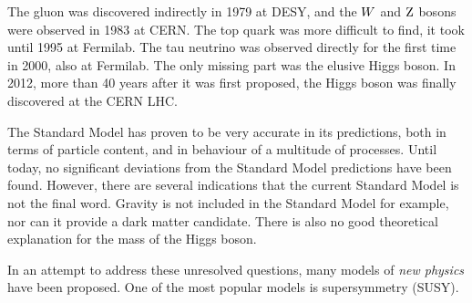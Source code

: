 The gluon was discovered indirectly in 1979 at DESY, and the $W$ and $\mathrm{Z}$ bosons were observed
in 1983 at CERN. The top quark was more difficult to find, it took until 1995 at Fermilab. The tau
neutrino was observed directly for the first time in 2000, also at Fermilab. The only missing part
was the elusive Higgs boson. In 2012, more than 40 years after it was first proposed, the Higgs
boson was finally discovered at the CERN LHC.

The Standard Model has proven to be very accurate in its predictions, both in terms of particle
content, and in behaviour of a multitude of processes. Until today, no significant deviations from
the Standard Model predictions have been found. However, there are several indications that the
current Standard Model is not the final word. Gravity is not included in the Standard Model for
example, nor can it provide a dark matter candidate. There is also no good theoretical explanation
for the mass of the Higgs boson. 

In an attempt to address these unresolved questions, many models of \textit{new physics} have been
proposed. One of the most popular models is supersymmetry (SUSY). 
